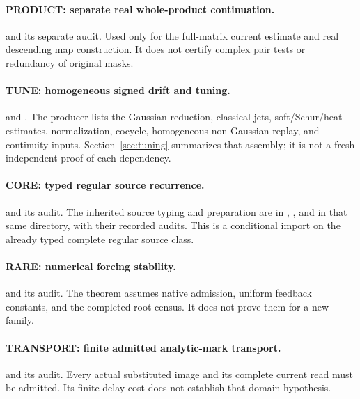 \paragraph{PRODUCT: separate real whole-product continuation.}
 and its separate audit. Used only for the full-matrix current estimate and real descending map construction. It does not certify complex pair tests or redundancy of original masks.

\paragraph{TUNE: homogeneous signed drift and tuning.}
 and
. The producer lists the Gaussian reduction, classical jets, soft/Schur/heat estimates, normalization, cocycle, homogeneous non-Gaussian replay, and continuity inputs. Section~\ref{sec:tuning} summarizes that assembly; it is not a fresh independent proof of each dependency.

\paragraph{CORE: typed regular source recurrence.}
 and its audit. The inherited source typing and preparation are in
,
, and
 in that same directory, with their recorded audits. This is a conditional import on the already typed complete regular source class.

\paragraph{RARE: numerical forcing stability.}
 and its audit. The theorem assumes native admission, uniform feedback constants, and the completed root census. It does not prove them for a new family.

\paragraph{TRANSPORT: finite admitted analytic-mark transport.}
 and its audit. Every actual substituted image and its complete current read must be admitted. Its finite-delay cost does not establish that domain hypothesis.

